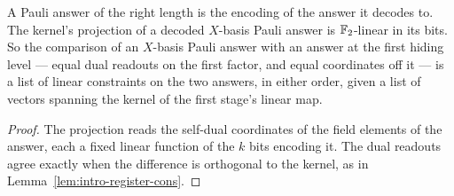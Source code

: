 \begin{lemma}
\label{lem:intro-pauli-hide}
\leanok
A Pauli answer of the right length is the encoding of the answer it decodes to. The kernel's
projection of a decoded $X$-basis Pauli answer is $\mathbb{F}_2$-linear in its bits. So the comparison of
an $X$-basis Pauli answer with an answer at the first hiding level --- equal dual readouts on the
first factor, and equal coordinates off it --- is a list of linear constraints on the two answers,
in either order, given a list of vectors spanning the kernel of the first stage's linear map.
\end{lemma}

\begin{proof}
\leanok
The projection reads the self-dual coordinates of the field elements of the answer, each a fixed
linear function of the $k$ bits encoding it. The dual readouts agree exactly when the difference
is orthogonal to the kernel, as in Lemma~\ref{lem:intro-register-cons}.
\end{proof}

